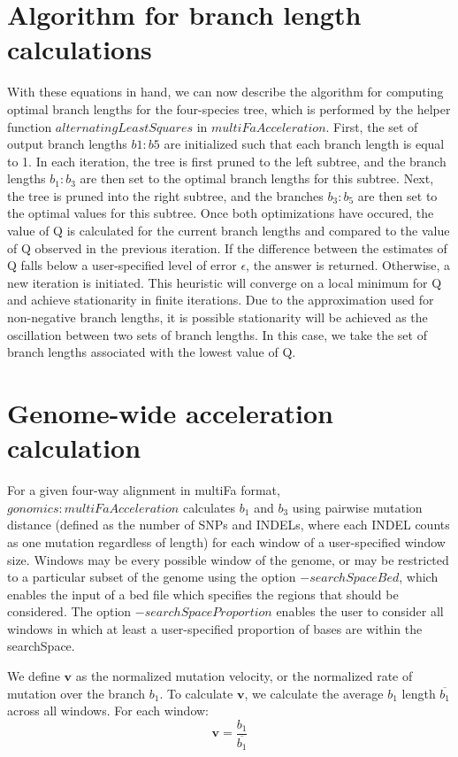\documentclass{article} %
\begin{document}
\section{Algorithm for branch length calculations}
With these equations in hand, we can now describe the algorithm for computing optimal branch lengths for the four-species tree, which is performed by the helper function $alternatingLeastSquares$ in $multiFaAcceleration$. First, the set of output branch lengths $b1: b5$ are initialized such that each branch length is equal to 1. In each iteration, the tree is first pruned to the left subtree, and the branch lengths $b_1:b_3$ are then set to the optimal branch lengths for this subtree. Next, the tree is pruned into the right subtree, and the branches $b_3:b_5$ are then set to the optimal values for this subtree. Once both optimizations have occured, the value of Q is calculated for the current branch lengths and compared to the value of Q observed in the previous iteration. If the difference between the estimates of Q falls below a user-specified level of error $\epsilon$, the answer is returned. Otherwise, a new iteration is initiated. This heuristic will converge on a local minimum for Q and achieve stationarity in finite iterations. Due to the approximation used for non-negative branch lengths, it is possible stationarity will be achieved as the oscillation between two sets of branch lengths. In this case, we take the set of branch lengths associated with the lowest value of Q.
\section{Genome-wide acceleration calculation}
For a given four-way alignment in multiFa format, $gonomics:multiFaAcceleration$ calculates $b_1$ and $b_3$ using pairwise mutation distance (defined as the number of SNPs and INDELs, where each INDEL counts as one mutation regardless of length) for each window of a user-specified window size. Windows may be every possible window of the genome, or may be restricted to a particular subset of the genome using the option $-searchSpaceBed$, which enables the input of a bed file which specifies the regions that should be considered. The option $-searchSpaceProportion$ enables the user to consider all windows in which at least a user-specified proportion of bases are within the searchSpace.

We define $\textbf{v}$ as the normalized mutation velocity, or the normalized rate of mutation over the branch $b_1$. To calculate $\textbf{v}$, we calculate the average $b_1$ length $\overline{b_1}$ across all windows. For each window:
\begin{equation*}
	\textbf{v} = \frac{b_1}{\overline{b_1}}
\end{equation*}
\end{document}
